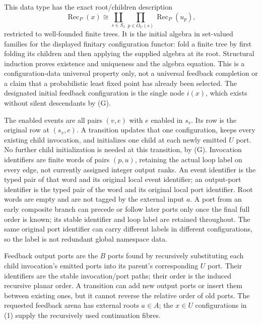 \documentclass[11pt]{article}
\begin{document}
This data type has the exact root/children description
\[
 \operatorname{Rec}_P(x)\cong
 \coprod_{s\in S_x}\prod_{p\in O_U(s)}\operatorname{Rec}_P(u_p),       \tag{1}
\]
restricted to well-founded finite trees. It is the initial algebra in set-valued families for the displayed finitary configuration functor: fold a finite tree by first folding its children and then applying the supplied algebra at its root. Structural induction proves existence and uniqueness and the algebra equation. This is a configuration-data universal property only, not a universal feedback completion or a claim that a probabilistic least fixed point has already been selected. The designated initial feedback configuration is the single node $i(x)$, which exists without silent descendants by (G).

The enabled events are all pairs $(v,e)$ with $e$ enabled in $s_v$. Its row is the original row at $(s_v,e)$. A transition updates that one configuration, keeps every existing child invocation, and initializes one child at each newly emitted $U$ port. No further child initialization is needed at this transition, by (G). Invocation identifiers are finite words of pairs $(p,u)$, retaining the actual loop label on every edge, not currently assigned integer output ranks. An event identifier is the typed pair of that word and its original local event identifier; an output-port identifier is the typed pair of the word and its original local port identifier. Root words are empty and are not tagged by the external input $a$. A port from an early composite branch can precede or follow later ports only once the final full order is known; its stable identifier and loop label are retained throughout. The same original port identifier can carry different labels in different configurations, so the label is not redundant global namespace data.

Feedback output ports are the $B$ ports found by recursively substituting each child invocation's emitted ports into its parent's corresponding $U$ port. Their identifiers are the stable invocation/port paths; their order is the induced recursive planar order. A transition can add new output ports or insert them between existing ones, but it cannot reverse the relative order of old ports. The requested feedback arena has external roots $a\in A$; the $x\in U$ configurations in (1) supply the recursively used continuation fibres.
\end{document}
